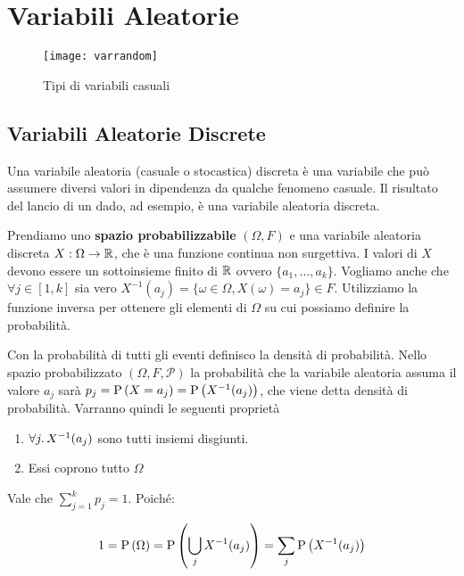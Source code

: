 \chapter{Variabili Aleatorie}

\begin{figure}[H]
    \centering
    \caption{Tipi di variabili casuali}
    \texttt{[image: varrandom]}
\end{figure}

\section{Variabili Aleatorie Discrete}

\begin{defn}
    Una variabile aleatoria (casuale o stocastica) discreta è una variabile che può assumere diversi valori in dipendenza da qualche fenomeno casuale.
    Il risultato del lancio di un dado, ad esempio, è una variabile aleatoria discreta.
    
    Prendiamo uno \textbf{spazio probabilizzabile} $ (\Omega, F) $ e una variabile aleatoria discreta $ X : \Omega \to \mathbb{R} $, che è una funzione continua non surgettiva. I valori di $ X $ devono essere un sottoinsieme finito di $ \mathbb{R} $ ovvero $ \{a_1, \dots, a_k\} $.
    Vogliamo anche che $ \forall j \in [1, k] $ sia vero $ X^{-1}(a_j) = \{ \omega \in \Omega, X(\omega) = a_j\} \in F $. Utilizziamo la funzione inversa per ottenere gli elementi di $ \Omega $ su cui possiamo definire la probabilità.
    
    Con la probabilità di tutti gli eventi definisco la densità di probabilità. Nello spazio probabilizzato $ (\Omega, F, \mathcal{P}) $ la probabilità che la variabile aleatoria assuma il valore $ a_j $ sarà $ p_j = \text{P}\left(X = a_j\right) = \text{P}\left(X^{-1}(a_j)\right) $, che viene detta densità di probabilità. Varranno quindi le seguenti proprietà
    
    \begin{enumerate}
        \item $ \forall j \ldotp X^{-1} (a_j) $ sono tutti insiemi disgiunti.
        \item Essi coprono tutto $ \Omega $
    \end{enumerate}
    Vale che $ \sum_{j=1}^{k} p_j = 1 $. Poiché:
    
    \begin{equation*}
        1 = \text{P}\left(\Omega\right) = \text{P}\left(\bigcup_{j} X^{-1}(a_j)\right) = \sum_{j} \text{P}\left(X^{-1}(a_j)\right)
    \end{equation*}
    

\end{defn}
